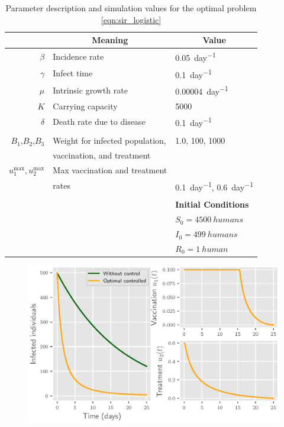 \begin{table}[htb]
  \begin{center}
    \begin{tabular}{@{}rll@{}} 
      \toprule
      &
      \multicolumn{1}{c}{\textbf{Meaning}}
      & 
      \multicolumn{1}{c}{\textbf{Value}}
      \\
        \midrule
        $\beta$
          & Incidence rate
          & \SI{0.05}{day^{-1}}
      \\
      $\gamma$
        & Infect time
        & \SI{0.1}{day^{-1}}
      \\
      $\mu$
        & Intrinsic growth rate
        & \SI{0.00004}{day^{-1}}
      \\
        $K$
        & Carrying capacity
        & \num{5000}
      \\
      $\delta$
        & Death rate due to disease
        & \SI{0.1}{day^{-1}}
      \\
      \\  
      $B_1$,$B_2$,$B_3$
        & Weight for infected population,
        & \num{1.0}, \num{100}, \num{1000}
        \\
        & vaccination, and treatment 
      \\
      $u_1^{\max}, u_2^{\max}$
        & Max vaccination and treatment 
        \\
        & rates
        & \SI{0.1}{day^{-1}}, \SI{0.6}{day^{-1}}
      \\
      \\
      && \textbf{Initial Conditions}
      \\
      \cmidrule{3-3}
      && $S_0 = \SI{4500}{humans}$
      \\
      && $I_0 = \SI{499}{humans}$
      \\
      && $R_0 = \SI{1}{human}$
      \\
      \bottomrule
    \end{tabular}
    \caption{Parameter description and simulation values for the optimal problem
      \eqref{eqn:sir_logistic}
    }
    \label{tbl:sir_logistic}
	\end{center}
\end{table}
%
\begin{figure}
  \centering
  \includegraphics{Figures/figure_1_sir_log}
  \caption{}
  \label{fig:figure1sirlog}
\end{figure}


